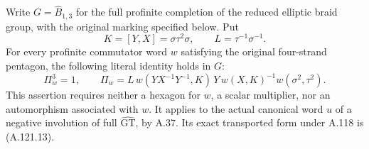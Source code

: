 Write \(G=\widehat B_{1,3}\) for the full profinite completion of the
reduced elliptic braid group, with the original marking specified below.
Put
\[
 K=[Y,X]=\sigma\tau^2\sigma,\qquad L=\tau^{-1}\sigma^{-1}.
\]
For every profinite commutator word \(w\) satisfying the original
four-strand pentagon, the following literal identity holds in \(G\):
\[
 \Pi_w^3=1,\qquad
 \Pi_w=L\,w(YX^{-1}Y^{-1},K)\,Y\,w(X,K)^{-1}
                      w(\sigma^2,\tau^2).                    \tag{A.121.1}
\]
This assertion requires neither a hexagon for \(w\), a scalar multiplier,
nor an automorphism associated with \(w\). It applies to the actual
canonical word \(u\) of a negative involution of full
\(\widehat{\mathrm{GT}}\), by A.37. Its exact transported form under
A.118 is (A.121.13).

